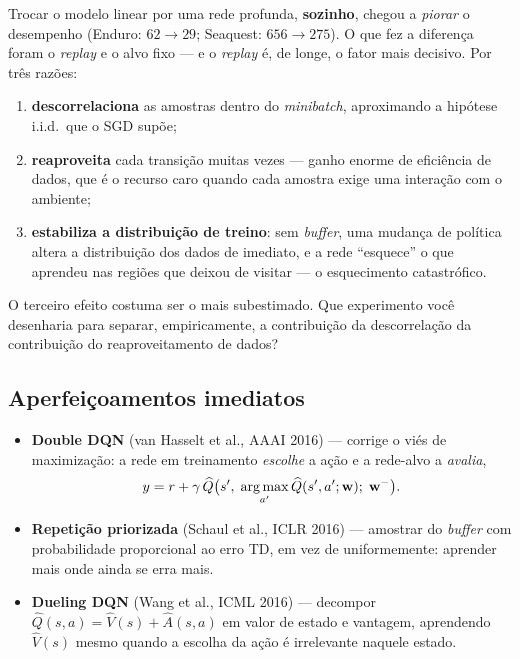 \documentclass[11pt]{article}
\newcommand{\Qhat}{\widehat{Q}}
\newcommand{\Vhat}{\widehat{V}}
\newcommand{\wv}{\mathbf{w}}
\newcommand{\wtar}{\mathbf{w}^{-}}
\begin{document}
Trocar o modelo linear por uma rede profunda, \textbf{sozinho}, chegou a
\emph{piorar} o desempenho (Enduro: $62 \to 29$; Seaquest: $656 \to 275$). O que
fez a diferença foram o \emph{replay} e o alvo fixo --- e o \emph{replay} é, de
longe, o fator mais decisivo. Por três razões:

\begin{enumerate}[itemsep=0.15em]
  \item \textbf{descorrelaciona} as amostras dentro do \emph{minibatch},
    aproximando a hipótese i.i.d.\ que o SGD supõe;
  \item \textbf{reaproveita} cada transição muitas vezes --- ganho enorme de
    eficiência de dados, que é o recurso caro quando cada amostra exige uma
    interação com o ambiente;
  \item \textbf{estabiliza a distribuição de treino}: sem \emph{buffer}, uma
    mudança de política altera a distribuição dos dados de imediato, e a rede
    ``esquece'' o que aprendeu nas regiões que deixou de visitar --- o
    esquecimento catastrófico.
\end{enumerate}

\begin{discbox}
  O terceiro efeito costuma ser o mais subestimado. Que experimento você
  desenharia para separar, empiricamente, a contribuição da descorrelação da
  contribuição do reaproveitamento de dados?
\end{discbox}

\subsection{Aperfeiçoamentos imediatos}

\begin{itemize}[itemsep=0.2em]
  \item \textbf{Double DQN} (van Hasselt et al., AAAI 2016) --- corrige o viés
    de maximização: a rede em treinamento \emph{escolhe} a ação e a rede-alvo a
    \emph{avalia},
    \[ y = r + \gamma\, \Qhat\bigl(s',\; \argmax_{a'} \Qhat(s',a';\wv);\; \wtar\bigr). \]
  \item \textbf{Repetição priorizada} (Schaul et al., ICLR 2016) --- amostrar do
    \emph{buffer} com probabilidade proporcional ao erro TD, em vez de
    uniformemente: aprender mais onde ainda se erra mais.
  \item \textbf{Dueling DQN} (Wang et al., ICML 2016) --- decompor
    $\Qhat(s,a) = \Vhat(s) + \widehat{A}(s,a)$ em valor de estado e vantagem,
    aprendendo $\Vhat(s)$ mesmo quando a escolha da ação é irrelevante naquele
    estado.
\end{itemize}
\end{document}
